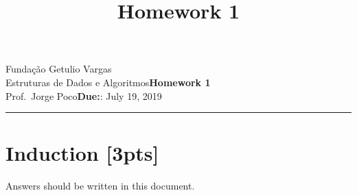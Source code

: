 \documentclass{article}
\title{Homework 1}
\date{}
\newcommand{\assignment}{Homework 1}
\newcommand{\duedate}{July 19, 2019}
\begin{document}
Fundação Getulio Vargas\hfill\\
Estruturas de Dados e Algoritmos\hfill\textbf{\assignment}\\
Prof.\ Jorge Poco\hfill\textbf{Due:}: \duedate\\
\smallskip\hrule\bigskip

{\let\newpage\relax\maketitle}
\maketitle

\section{Induction [3pts]}
Answers should be written in this document. 
\end{document}
